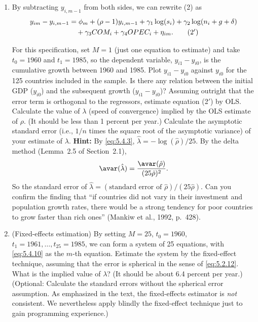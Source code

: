 \begin{problemset}
\begin{enumerate}[label=(\alph*)]
\item By subtracting $y_{i,m-1}$ from both sides, we can rewrite (2) as
  \begin{align}
    y_{im} - y_{i,m-1} &= \phi_m + (\rho - 1)y_{i,m-1}
    + \gamma_1 \log(s_i) + \gamma_2 \log(n_i + g + \delta)
    \notag \\
    &\quad + \gamma_3 COM_i + \gamma_4 OPEC_i + \eta_{im}. \tag{2$'$}
  \end{align}

  For this specification, set $M = 1$ (just one equation to estimate) and take $t_0 = 1960$
  and $t_1 = 1985$, so the dependent variable, $y_{i1} - y_{i0}$, is the cumulative
  growth between 1960 and 1985.
  Plot $y_{i1} - y_{i0}$ against $y_{i0}$ for the 125 countries
  included in the sample. Is there any relation between the initial GDP ($y_{i0}$)
  and the subsequent growth ($y_{i1} - y_{i0}$)? Assuming outright that the error term is
  orthogonal to the regressors, estimate equation (2$'$) by OLS. Calculate the value
  of $\lambda$ (speed of convergence) implied by the OLS estimate of $\rho$. (It should be
  less than 1 percent per year.) Calculate the asymptotic standard error (i.e., $1/n$
  times the square root of the asymptotic variance) of your estimate of $\lambda$.
  \textbf{Hint:}
  By \eqref{eq:5.4.3}, $\hat{\lambda} = -\log(\hat{\rho})/25$. By the delta method (Lemma~2.5 of Section~2.1),
  \[
    \avar(\hat{\lambda}) = \frac{\avar(\hat{\rho})}{(25\hat{\rho})^2}.
  \]
  So the standard error of $\hat{\lambda} = (\text{standard error of } \hat{\rho})/(25\hat{\rho})$.
  Can you confirm the
  finding that ``if countries did not vary in their investment and population growth
  rates, there would be a strong tendency for poor countries to grow faster than
  rich ones'' (Mankiw et al., 1992, p.~428).

\item (Fixed-effects estimation)\quad
  By setting $M = 25$, $t_0 = 1960$,
  $t_1 = 1961, \ldots, t_{25} = 1985$, we can form a system of 25 equations, with
  \eqref{eq:5.4.10} as the
  $m$-th equation. Estimate the system by the fixed-effect technique, assuming
  that the error is spherical in the sense of \eqref{eq:5.2.12}. What is the implied value
  of $\lambda$? (It should be about 6.4 percent per year.) (Optional: Calculate the standard
  errors without the spherical error assumption. As emphasized in the text,
  the fixed-effects estimator is \emph{not} consistent. We nevertheless apply blindly the
  fixed-effect technique just to gain programming experience.)


\end{enumerate}
\end{problemset}
